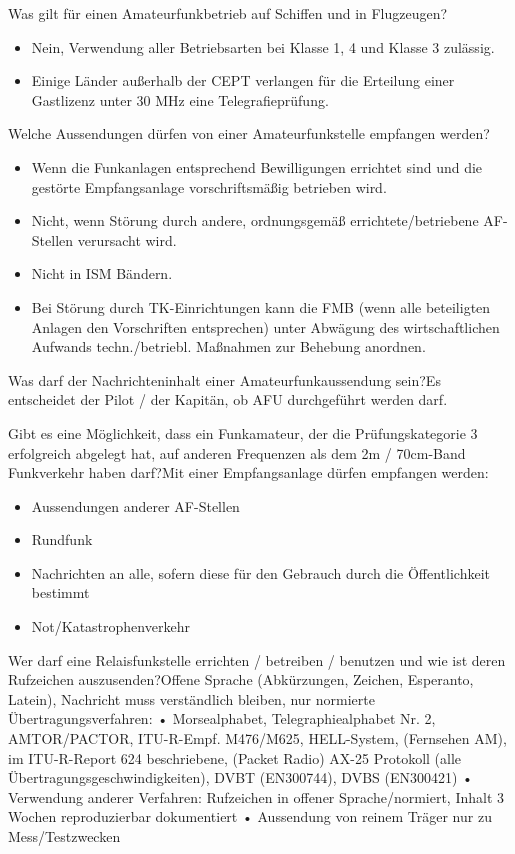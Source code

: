 \documentclass[avery5371,grid,frame,a4paper]{flashcards}
\newcommand{\card}[3]{
  \begin{flashcard}[{\chap} -- #1]{#2}#3\end{flashcard}
}
\begin{document}
\card{49}{Was gilt für einen Amateurfunkbetrieb auf Schiffen und in Flugzeugen?}{\begin{itemize}\itemsep1pt \item Nein, Verwendung aller Betriebsarten bei Klasse 1, 4 und Klasse 3 zulässig. \item Einige Länder außerhalb der CEPT verlangen für die Erteilung einer Gastlizenz
unter 30 MHz eine Telegrafieprüfung.\end{itemize}}

\card{50}{Welche Aussendungen dürfen von einer Amateurfunkstelle empfangen werden?}{\small{\begin{itemize}\itemsep0pt \item Wenn die Funkanlagen entsprechend Bewilligungen errichtet sind und die gestörte Empfangsanlage vorschriftsmäßig betrieben wird. \item Nicht, wenn Störung durch andere, ordnungsgemäß errichtete/betriebene AF-Stellen verursacht wird. \item Nicht in ISM Bändern. \item Bei Störung durch TK-Einrichtungen kann die FMB (wenn alle beteiligten Anlagen den Vorschriften entsprechen) unter Abwägung des wirtschaftlichen Aufwands techn./betriebl. Maßnahmen zur Behebung anordnen.\end{itemize}}}

\card{51}{Was darf der Nachrichteninhalt einer Amateurfunkaussendung sein?}{Es entscheidet der Pilot / der Kapitän, ob AFU durchgeführt werden darf.}

\card{52}{Gibt es eine Möglichkeit, dass ein Funkamateur, der die Prüfungskategorie 3 erfolgreich abgelegt hat, auf anderen Frequenzen als dem 2m / 70cm-Band Funkverkehr haben darf?}{Mit einer Empfangsanlage dürfen empfangen werden: \begin{itemize}\itemsep1pt \item Aussendungen anderer AF-Stellen \item Rundfunk \item Nachrichten an alle, sofern diese für den
Gebrauch durch die Öffentlichkeit bestimmt \item Not/Katastrophenverkehr\end{itemize}}

\card{53}{Wer darf eine Relaisfunkstelle errichten / betreiben / benutzen und wie ist deren Rufzeichen auszusenden?}{\small{Offene Sprache (Abkürzungen, Zeichen, Esperanto, Latein), Nachricht muss verständlich bleiben, nur normierte Übertragungsverfahren:
•  Morsealphabet, Telegraphiealphabet Nr. 2, AMTOR/PACTOR, ITU-R-Empf. M476/M625, HELL-System, (Fernsehen AM), im ITU-R-Report 624 beschriebene, (Packet Radio) AX-25
Protokoll (alle Übertragungsgeschwindigkeiten), DVBT (EN300744), DVBS (EN300421)
•  Verwendung anderer Verfahren: Rufzeichen in offener Sprache/normiert, Inhalt 3 Wochen reproduzierbar dokumentiert
•  Aussendung von reinem Träger nur zu Mess/Testzwecken}}
\end{document}
